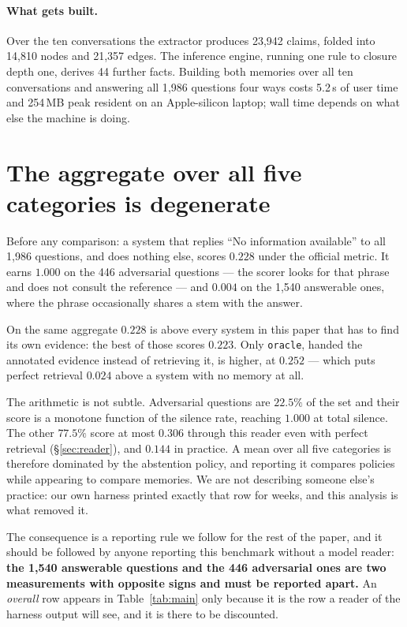 \documentclass[11pt]{article}
\newcommand{\arm}[1]{\texttt{#1}}
\begin{document}
\paragraph{What gets built.} Over the ten conversations the extractor produces
23{,}942 claims, folded into 14{,}810 nodes and 21{,}357 edges. The inference
engine, running one rule to closure depth one, derives 44 further facts.
Building both memories over all ten conversations and answering all 1{,}986
questions four ways costs 5.2\,s of user time and 254\,MB peak resident on an
Apple-silicon laptop; wall time depends on what else the machine is doing.

\section{The aggregate over all five categories is degenerate}
\label{sec:degenerate}

Before any comparison: a system that replies ``No information available'' to
all 1{,}986 questions, and does nothing else, scores $0.228$ under the official
metric. It earns $1.000$ on the 446 adversarial questions --- the scorer looks
for that phrase and does not consult the reference --- and $0.004$ on the
1{,}540 answerable ones, where the phrase occasionally shares a stem with the
answer.

On the same aggregate $0.228$ is above every system in this paper that has to
find its own evidence: the best of those scores $0.223$. Only \arm{oracle},
handed the annotated evidence instead of retrieving it, is higher, at $0.252$
--- which puts perfect retrieval $0.024$ above a system with no memory at all.

The arithmetic is not subtle. Adversarial questions are $22.5\%$ of the set and
their score is a monotone function of the silence rate, reaching $1.000$ at
total silence. The other $77.5\%$ score at most $0.306$ through this reader
even with perfect retrieval (\S\ref{sec:reader}), and $0.144$ in practice. A
mean over all five categories is therefore dominated by the abstention policy,
and reporting it compares policies while appearing to compare memories.
We are not describing someone else's practice: our own harness printed exactly
that row for weeks, and this analysis is what removed it.

The consequence is a reporting rule we follow for the rest of the paper, and it
should be followed by anyone reporting this benchmark without a model reader:
\textbf{the 1{,}540 answerable questions and the 446 adversarial ones are two
measurements with opposite signs and must be reported apart.} An \emph{overall}
row appears in Table~\ref{tab:main} only because it is the row a reader of the
harness output will see, and it is there to be discounted.
\end{document}

